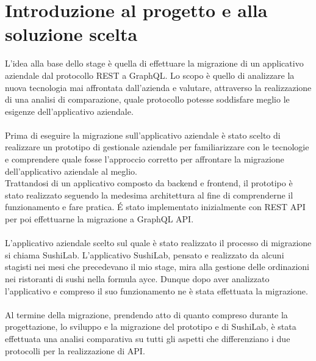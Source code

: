 \section{Introduzione al progetto e alla soluzione scelta}
L'idea alla base dello stage è quella di effettuare la migrazione di un applicativo aziendale dal protocollo REST a GraphQL. Lo scopo è quello di analizzare la nuova tecnologia mai affrontata dall'azienda e valutare, attraverso la realizzazione di una analisi di comparazione, quale protocollo potesse soddisfare meglio le esigenze dell'applicativo aziendale.\\ \\
Prima di eseguire la migrazione sull'applicativo aziendale è stato scelto di realizzare un prototipo di gestionale aziendale per familiarizzare con le tecnologie e comprendere quale fosse l'approccio corretto per affrontare la migrazione dell'applicativo aziendale al meglio.\\
Trattandosi di un applicativo composto da backend e frontend, il prototipo è stato realizzato seguendo la medesima architettura al fine di comprenderne il funzionamento e fare pratica. É stato implementato inizialmente con REST API per poi effettuarne la migrazione a GraphQL API.\\ \\
L'applicativo aziendale scelto sul quale è stato realizzato il processo di migrazione si chiama SushiLab. L'applicativo SushiLab, pensato e realizzato da alcuni stagisti nei mesi che precedevano il mio stage, mira alla gestione delle ordinazioni nei ristoranti di sushi nella formula \gls{ayce}. Dunque dopo aver analizzato l'applicativo e compreso il suo funzionamento ne è stata effettuata la migrazione.\\ \\
Al termine della migrazione, prendendo atto di quanto compreso durante la progettazione, lo sviluppo e la migrazione del prototipo e di SushiLab, è stata effettuata una analisi comparativa su tutti gli aspetti che differenziano i due protocolli per la realizzazione di API.
